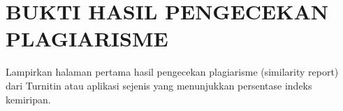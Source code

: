\clearpage
\chapter*{BUKTI HASIL PENGECEKAN PLAGIARISME}
\label{lamp:bukti-plagiarisme}

Lampirkan halaman pertama hasil pengecekan plagiarisme (similarity report) dari Turnitin atau aplikasi sejenis yang menunjukkan persentase indeks kemiripan.

\begin{center}
\end{center}
